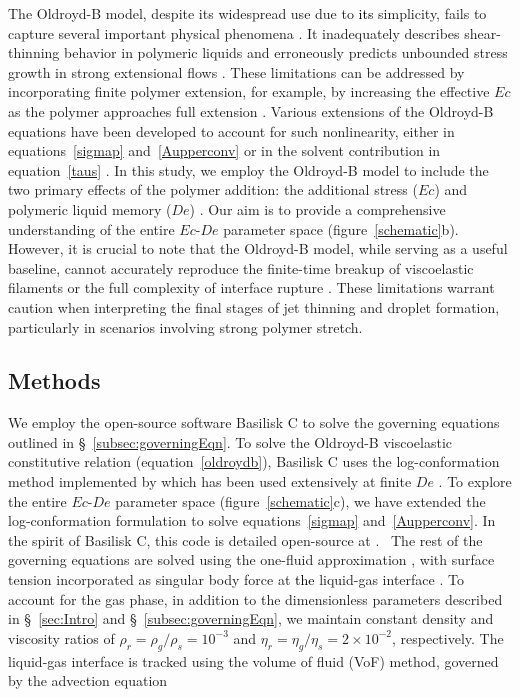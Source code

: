\documentclass{jfm}
\newcommand{\DL}[1]{{\textcolor{black}{#1}}}
\newcommand{\AO}[1]{{\textcolor{black}{#1}}}
\newcommand{\oo}{\color{magenta} \normalfont}
\newcommand{\bb}{\color{black} \normalfont}
\begin{document}
The Oldroyd-B model, despite its widespread use due to \AO{its} simplicity, fails to capture several important physical phenomena \citep{snoeijer2020relationship}. It inadequately describes shear-thinning behavior in polymeric liquids \citep{yamani2023master} and erroneously predicts unbounded stress growth in strong extensional flows \citep{mckinley2002filament, eggers2020self}. 
These limitations can be addressed by incorporating finite polymer extension, for example, by increasing the effective $Ec$ as the polymer approaches full extension \citep{hinch2021oldroyd,zinelis2023transition}. Various extensions of the Oldroyd-B equations have been developed to account for such nonlinearity, either in equations~\eqref{sigmap} and~\eqref{Aupperconv} or in the solvent contribution in equation~\eqref{taus} \citep{de1974coil,tanner2000engineering,mckinley2002filament,alves2021numerical}. In this study, we employ the Oldroyd-B model to include the two primary effects of the polymer addition: the additional stress ($Ec$) and polymeric liquid memory ($De$) \citep{snoeijer2020relationship}. Our aim is to provide a comprehensive understanding of the entire $Ec$-$De$ parameter space (figure~\ref{schematic}b).
\oo 
However, it is crucial to note that the Oldroyd-B model, while serving as a useful baseline, cannot accurately reproduce the finite-time breakup of viscoelastic filaments \citep{eggers2020self} or the full complexity of interface rupture \citep{lohse-2020-pnas}. These limitations warrant caution when interpreting the final stages of jet thinning and droplet formation, particularly in scenarios involving strong polymer stretch.
\bb


\subsection {Methods}

We employ the open-source software Basilisk C \citep{basilliskpopinet, popinet2015quadtree} to solve the governing equations outlined in \S~\ref{subsec:governingEqn}.
\oo
To solve the Oldroyd-B viscoelastic constitutive relation (equation~\eqref{oldroydb}), Basilisk C uses the log-conformation method \citep{fattal2004constitutive} implemented by \citet{lopez2019adaptive} which has been used extensively at finite $De$ \citep{turkoz2018axisymmetric, turkoz2021simulation}. To explore the entire $Ec$-$De$ parameter space  (figure~\ref{schematic}c), we have extended the log-conformation formulation to solve equations~\eqref{sigmap} and~\eqref{Aupperconv}. In the spirit of Basilisk C, this code is detailed open-source at \citet{vatsalElastoFlow2024}.\bb\,
The rest of the governing equations are solved using the one-fluid approximation \citep{tryggvason2011direct}, with surface tension incorporated as singular body force at \DL{the} liquid-gas interface \citep{brackbill1992continuum}.
To account for the gas phase, in addition to the dimensionless parameters described in \S~\ref{sec:Intro} and \S~\ref{subsec:governingEqn}, we maintain constant density and viscosity ratios of $\rho_{r} = \rho_{g}/\rho_{s} = 10^{-3}$ and $\eta_{r} = \eta_{g}/\eta_{s} = 2 \times 10^{-2}$, respectively.
The liquid-gas interface is tracked using the volume of fluid (VoF) method, governed by the advection equation
\end{document}
